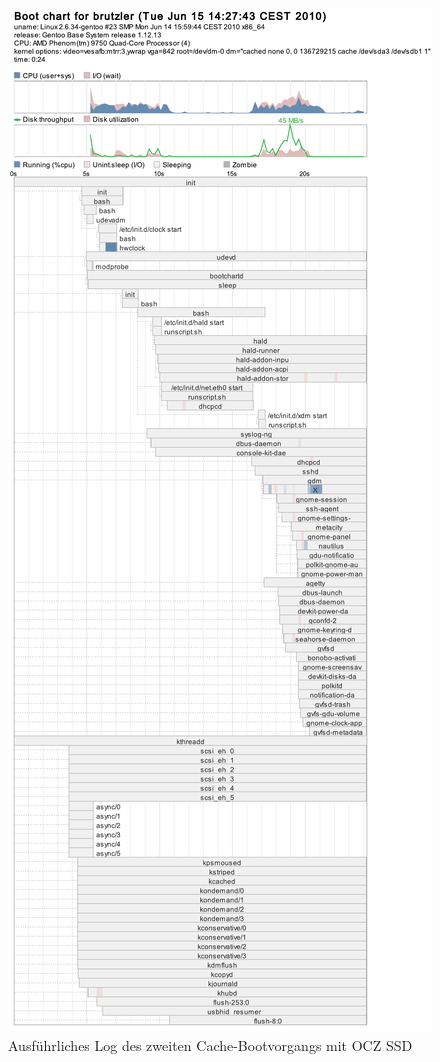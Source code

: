 \begin{figure}[H]\centering
	\includegraphics[scale=0.4]{figures/appendix/bootchart-cache2}
    \caption{Ausführliches Log des zweiten Cache-Bootvorgangs mit OCZ SSD}
    \label{img:bootchart-cache2}
\end{figure}

